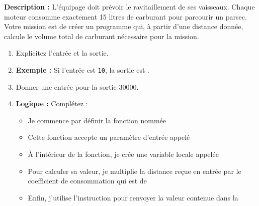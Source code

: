 \begin{Exercise}[title={La fonction \texttt{calculer\_carburant} (Simple) }]
\textbf{Description :} L'équipage doit prévoir le ravitaillement de ses vaisseaux. Chaque moteur consomme exactement 15 litres de carburant pour parcourir un parsec. Votre mission est de créer un programme qui, à partir d'une distance donnée, calcule le volume total de carburant nécessaire pour la mission.
\begin{enumerate}
    \item Explicitez l'entrée et la sortie.
    \item \textbf{Exemple :} Si l'entrée est \texttt{10}, la sortie est \dotfill.
    \item Donner une entrée pour la sortie 30000.
    \item \textbf{Logique :} Complétez :
    \begin{itemize}
        \item Je commence par définir la fonction nommée \dotfill
        \item Cette fonction accepte un paramètre d'entrée appelé \dotfill
        \item À l'intérieur de la fonction, je crée une variable locale appelée \dotfill
        \item Pour calculer sa valeur, je multiplie la distance reçue en entrée par le coefficient de consommation qui est de \dotfill
        \item Enfin, j'utilise l'instruction \dotfill pour renvoyer la valeur contenue dans la \dotfill
    \end{itemize}
    
\end{enumerate}
\end{Exercise}

